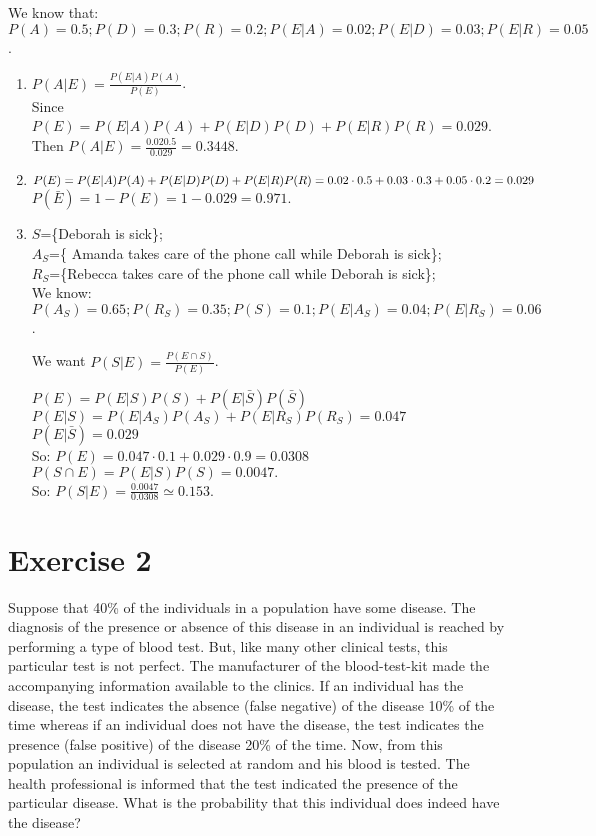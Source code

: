 \documentclass[12pt,thmsa]{article}
\begin{document}
We know that: $P(A)=0.5; P(D)=0.3; P(R)=0.2; P(E \vert A)=0.02; P(E \vert D)=0.03; P(E \vert R)=0.05$.

\begin{enumerate}
  \item $P(A \vert E)= \frac{P(E\vert A) P(A)}{P(E)}$.  \\
  Since $P(E)=P(E \vert A) P(A)+ P(E \vert D) P(D)+ P(E \vert R) P(R)=0.029$. \\
  Then $P(A \vert E)=\frac{0.02 0.5}{0.029}=0.3448$.

  \item $P(E)=P(E \vert A)P(A)+P(E \vert D) P(D)+P(E \vert R) P(R)\\= 0.02\cdot0.5+0.03\cdot 0.3+0.05\cdot 0.2=0.029$\\
$P(\bar{E})=1-P(E)=1-0.029=0.971$.


  \item  $S$=\{Deborah is sick\}; \\
$A_S$=\{ Amanda takes care of the phone call while Deborah is sick\}; \\
$R_S$=\{Rebecca takes care of the phone call while Deborah is sick\}; \\

We know: $P(A_S)=0.65; P(R_S)=0.35; P(S)=0.1; P(E \vert A_S)=0.04; P(E \vert R_S)=0.06$.

We want $P(S \vert E)=  \frac{P(E \cap S)}{P(E)}$.

$P(E)=P(E \vert S)P(S)+P(E \vert \bar{S}) P(\bar{S})$\\
$P(E \vert S)=P(E \vert A_S) P(A_S) + P(E\vert R_S) P(R_S) =0.047$\\
$P(E \vert \bar{S})= 0.029$\\
So: $P(E)= 0.047 \cdot 0.1 + 0.029 \cdot 0.9= 0.0308$\\
$P(S \cap E) = P(E \vert S) P(S)= 0.0047.$\\
So: $P(S \vert E)= \frac{0.0047}{0.0308}\simeq 0.153$.

\end{enumerate}

\section*{Exercise 2}

Suppose that 40\% of the individuals in a population have some disease. The diagnosis of the presence or absence of this disease in an individual is reached by performing a type of blood test. But, like many other clinical tests, this particular test is not perfect. The manufacturer of the blood-test-kit made the accompanying information available to the clinics. If an individual has the disease, the test indicates the absence (false negative) of the disease 10\% of the time whereas if an individual does not have the disease, the test indicates the presence (false positive) of the disease 20\% of the time. Now, from this population an individual is selected at random and his blood is tested. The health professional is informed that the test indicated the presence of the particular disease. What is the probability that this individual does indeed have the disease? 
\end{document}
